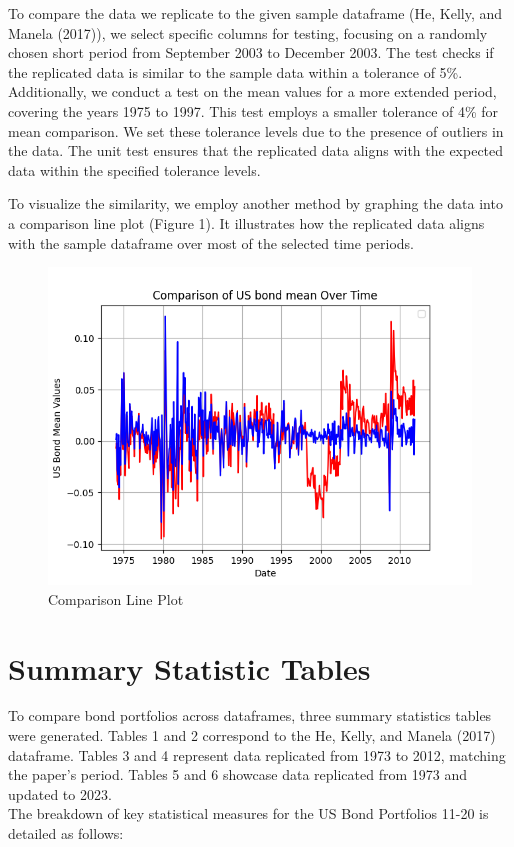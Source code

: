 \documentclass{article}
\begin{document}
To compare the data we replicate to the given sample dataframe (He, Kelly, and Manela (2017)),  we select specific columns for testing, focusing on a randomly chosen short period from September 2003 to December 2003. The test checks if the replicated data is similar to the sample data within a tolerance of 5\%. Additionally, we conduct a test on the mean values for a more extended period, covering the years 1975 to 1997. This test employs a smaller tolerance of 4\% for mean comparison. We set these tolerance levels due to the presence of outliers in the data. The unit test ensures that the replicated data aligns with the expected data within the specified tolerance levels.

To visualize the similarity, we employ another method by graphing the data into a comparison line plot (Figure 1). It illustrates how the replicated data aligns with the sample dataframe over most of the selected time periods.

\begin{figure} [h]
    \centering
    \includegraphics[width=0.75\linewidth]{output/comparison_lineplot.png}
    \caption{Comparison Line Plot}
    \label{fig:comparison plot}
\end{figure}
\clearpage  %

\section{ Summary Statistic Tables}
To compare bond portfolios across dataframes, three summary statistics tables were generated. Tables 1 and 2 correspond to the He, Kelly, and Manela (2017) dataframe. Tables 3 and 4 represent data replicated from 1973 to 2012, matching the paper's period. Tables 5 and 6 showcase data replicated from 1973 and updated to 2023.  
\\
The breakdown of key statistical measures for the US Bond Portfolios 11-20 is detailed as follows: 
\end{document}
